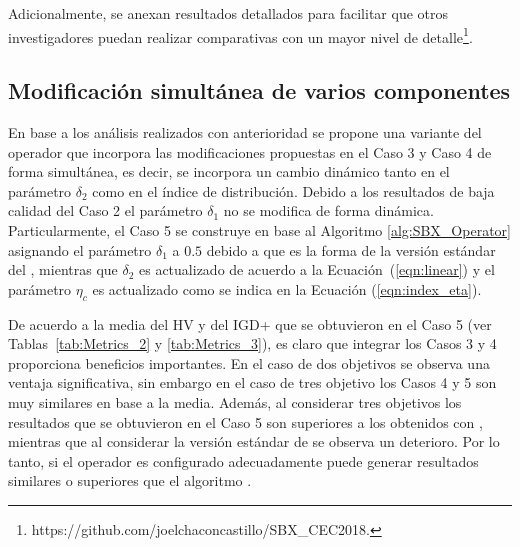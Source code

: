 %
%
Adicionalmente, se anexan resultados detallados para facilitar que otros investigadores puedan realizar comparativas con un mayor
nivel de detalle\footnote{https:\//\//github.com\//joelchaconcastillo\//SBX\_CEC2018.}.


\subsection{Modificación simultánea de varios componentes}

En base a los análisis realizados con anterioridad se propone una variante del operador \SBX{} que incorpora las modificaciones propuestas
en el Caso 3 y Caso 4 de forma simultánea, es decir, se incorpora un cambio dinámico tanto en el parámetro $\delta_2$ como en el índice de distribución.
%
Debido a los resultados de baja calidad del Caso 2 el parámetro $\delta_1$ no se modifica de forma dinámica.
%
Particularmente, el Caso 5 se construye en base al Algoritmo \ref{alg:SBX_Operator} asignando el parámetro $\delta_1$ a $0.5$ debido
a que es la forma de la versión estándar del \SBX{}, mientras que $\delta_2$ es actualizado de acuerdo a la Ecuación~(\ref{eqn:linear}) y
el parámetro $\eta_c$ es actualizado como se indica en la Ecuación (\ref{eqn:index_eta}).

De acuerdo a la media del HV y del IGD+ que se obtuvieron en el Caso 5 (ver Tablas~\ref{tab:Metrics_2} y \ref{tab:Metrics_3}), es claro que integrar los 
Casos 3 y 4 proporciona beneficios importantes.
%
En el caso de dos objetivos se observa una ventaja significativa, sin embargo en el caso de tres objetivo los Casos 4 y 5 son muy similares en base a la media.
%
Además, al considerar tres objetivos los resultados que se obtuvieron en el Caso 5 son superiores a los obtenidos con \DE{}, 
mientras que al considerar la versión estándar de \SBX{} se observa un deterioro.
%
Por lo tanto, si el operador \SBX{} es configurado adecuadamente puede generar resultados similares o superiores que el algoritmo \DEMO{}. 

